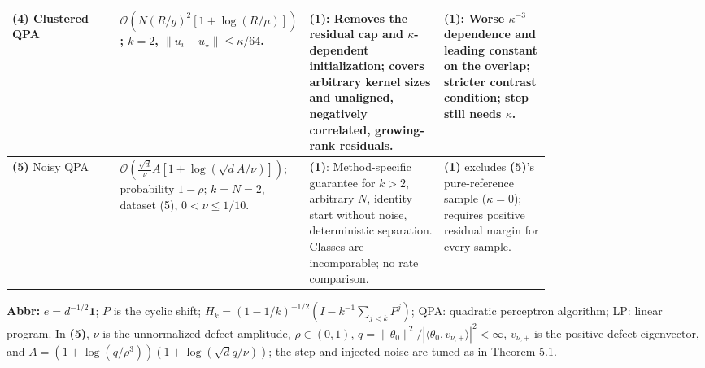 \begin{table}[tp]
\begin{threeparttable}
\begin{tabularx}{\linewidth}{@{}>{\raggedright\arraybackslash}p{0.20\linewidth}>{\raggedright\arraybackslash}p{0.32\linewidth}>{\raggedright\arraybackslash}p{0.25\linewidth}>{\raggedright\arraybackslash}X@{}}
\midrule
\textbf{(4)} Clustered QPA \citep{kcpClustered} & $\mathcal{O}\!\left(N(R/g)^2[1+\log(R/\mu)]\right)$; $k=2$, $\|u_i-u_\star\|\le\kappa/64$. & \textbf{(1)}: Removes the residual cap and $\kappa$-dependent initialization; covers arbitrary kernel sizes and unaligned, negatively correlated, growing-rank residuals. & \textbf{(1)}: Worse $\kappa^{-3}$ dependence and leading constant on the overlap; stricter contrast condition; step still needs $\kappa$. \\
\midrule
\textbf{(5)} Noisy QPA \citep[Theorem 5.1]{kcpTyurinV2} & $\mathcal{O}\!\left(\frac{\sqrt d}{\nu}A[1+\log(\sqrt d A/\nu)]\right)$; probability $1-\rho$; $k=N=2$, dataset (5), $0<\nu\le1/10$. & \textbf{(1)}: Method-specific guarantee for $k>2$, arbitrary $N$, identity start without noise, deterministic separation. Classes are incomparable; no rate comparison. & \textbf{(1)} excludes \textbf{(5)}'s pure-reference sample ($\kappa=0$); requires positive residual margin for every sample. \\
\bottomrule
\end{tabularx}
\begin{tablenotes}[flushleft]\footnotesize
\item[] \textbf{Abbr:} $e=d^{-1/2}\mathbf1$; $P$ is the cyclic shift; $H_k=(1-1/k)^{-1/2}(I-k^{-1}\sum_{j<k}P^j)$; QPA: quadratic perceptron algorithm; LP: linear program. In \textbf{(5)}, $\nu$ is the unnormalized defect amplitude, $\rho\in(0,1)$, $q=\|\theta_0\|^2/|\langle\theta_0,v_{\nu,+}\rangle|^2<\infty$, $v_{\nu,+}$ is the positive defect eigenvector, and $A=(1+\log(q/\rho^3))(1+\log(\sqrt d q/\nu))$; the step and injected noise are tuned as in Theorem 5.1.
\end{tablenotes}
\end{threeparttable}
\end{table}
\clearpage
